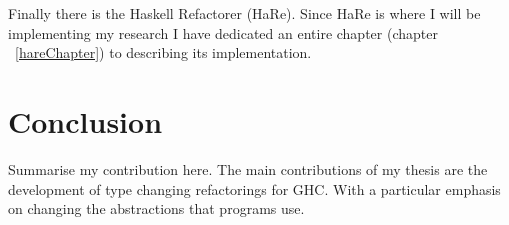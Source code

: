 Finally there is the Haskell Refactorer (HaRe). Since HaRe is where I will be implementing my research I have dedicated an entire chapter (chapter ~\ref{hareChapter}) to describing its implementation. 


\chapter{Conclusion}
Summarise my contribution here. The main contributions of my thesis are the development of type changing refactorings for GHC. With a particular emphasis on changing the abstractions that programs use.



\cleardoublepage
{}
\label{index}
\printindex


